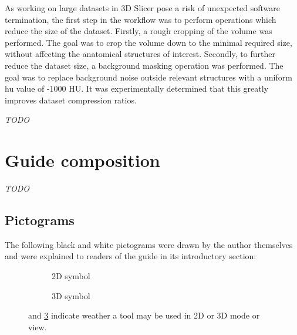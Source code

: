 \noindent
As working on large datasets in 3D Slicer pose a risk of unexpected software termination, the first step in the workflow was to perform operations which reduce the size of the dataset.
Firstly, a rough cropping of the volume was performed.
The goal was to crop the volume down to the minimal required size, without affecting the anatomical structures of interest.
Secondly, to further reduce the dataset size, a background masking operation was performed.
The goal was to replace background noise outside relevant structures with a uniform \acrshort{hu} value of -1000 HU.
It was experimentally determined that this greatly improves dataset compression ratios.


\textit{TODO}

\section{Guide composition}\label{s:guide_comp}


\textit{TODO}

\subsection{Pictograms}\label{s:mm-pictograms}
The following black and white pictograms were drawn by the author themselves and were explained to readers of the guide in its introductory section:
\newline
\begin{figure}[h!]
	\begin{centering}
		\begin{subfigure}{0.5\textwidth}
			
			\caption{2D symbol}\label{fig:2d_icon}
		\end{subfigure}
		\begin{subfigure}{0.5\textwidth}
			
			\caption{3D symbol}\label{fig:3d_icon}
		\end{subfigure}
	\end{centering}
	\caption{ and \cref{fig:3d_icon} indicate weather a tool may be used in 2D or 3D mode or view.}
\end{figure}

